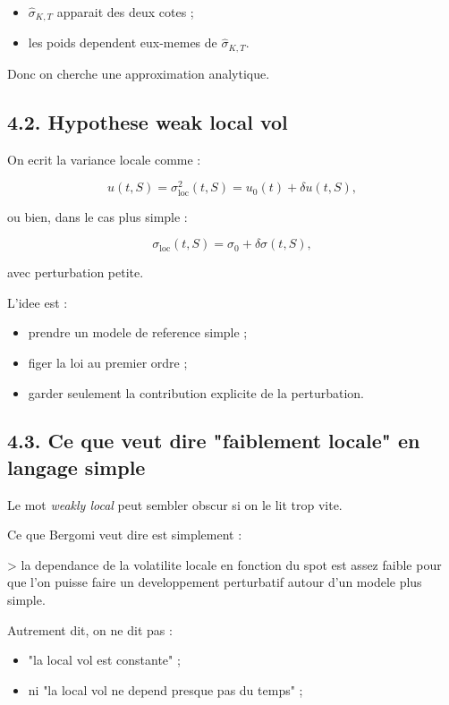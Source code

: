 \documentclass[11pt,a4paper]{article}
\begin{document}
\begin{itemize}
\item \(\widehat{\sigma}_{K,T}\) apparait des deux cotes ;
\item les poids dependent eux-memes de \(\widehat{\sigma}_{K,T}\).
\end{itemize}

Donc on cherche une approximation analytique.

\subsection{4.2. Hypothese weak local vol}

On ecrit la variance locale comme :

\[
u(t,S)=\sigma_{\mathrm{loc}}^2(t,S)=u_0(t)+\delta u(t,S),
\]

ou bien, dans le cas plus simple :

\[
\sigma_{\mathrm{loc}}(t,S)=\sigma_0+\delta\sigma(t,S),
\]

avec perturbation petite.

L'idee est :

\begin{itemize}
\item prendre un modele de reference simple ;
\item figer la loi au premier ordre ;
\item garder seulement la contribution explicite de la perturbation.
\end{itemize}

\subsection{4.3. Ce que veut dire "faiblement locale" en langage simple}

Le mot \emph{weakly local} peut sembler obscur si on le lit trop vite.

Ce que Bergomi veut dire est simplement :

> la dependance de la volatilite locale en fonction du spot est assez faible pour que l'on puisse faire un developpement perturbatif autour d'un modele plus simple.

Autrement dit, on ne dit pas :

\begin{itemize}
\item "la local vol est constante" ;
\item ni "la local vol ne depend presque pas du temps" ;
\end{itemize}
\end{document}
